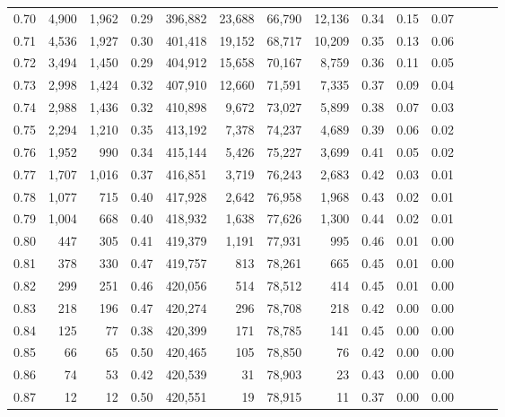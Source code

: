 \begin{tabular}{rrrrrrrrrrrrrr}
0.70 &   4,900 &  1,962 &  0.29 &  396,882 &   23,688 &  66,790 &  12,136 &  0.34 &  0.15 &      0.07 \\
0.71 &   4,536 &  1,927 &  0.30 &  401,418 &   19,152 &  68,717 &  10,209 &  0.35 &  0.13 &      0.06 \\
0.72 &   3,494 &  1,450 &  0.29 &  404,912 &   15,658 &  70,167 &   8,759 &  0.36 &  0.11 &      0.05 \\
0.73 &   2,998 &  1,424 &  0.32 &  407,910 &   12,660 &  71,591 &   7,335 &  0.37 &  0.09 &      0.04 \\
0.74 &   2,988 &  1,436 &  0.32 &  410,898 &    9,672 &  73,027 &   5,899 &  0.38 &  0.07 &      0.03 \\
0.75 &   2,294 &  1,210 &  0.35 &  413,192 &    7,378 &  74,237 &   4,689 &  0.39 &  0.06 &      0.02 \\
0.76 &   1,952 &    990 &  0.34 &  415,144 &    5,426 &  75,227 &   3,699 &  0.41 &  0.05 &      0.02 \\
0.77 &   1,707 &  1,016 &  0.37 &  416,851 &    3,719 &  76,243 &   2,683 &  0.42 &  0.03 &      0.01 \\
0.78 &   1,077 &    715 &  0.40 &  417,928 &    2,642 &  76,958 &   1,968 &  0.43 &  0.02 &      0.01 \\
0.79 &   1,004 &    668 &  0.40 &  418,932 &    1,638 &  77,626 &   1,300 &  0.44 &  0.02 &      0.01 \\
0.80 &     447 &    305 &  0.41 &  419,379 &    1,191 &  77,931 &     995 &  0.46 &  0.01 &      0.00 \\
0.81 &     378 &    330 &  0.47 &  419,757 &      813 &  78,261 &     665 &  0.45 &  0.01 &      0.00 \\
0.82 &     299 &    251 &  0.46 &  420,056 &      514 &  78,512 &     414 &  0.45 &  0.01 &      0.00 \\
0.83 &     218 &    196 &  0.47 &  420,274 &      296 &  78,708 &     218 &  0.42 &  0.00 &      0.00 \\
0.84 &     125 &     77 &  0.38 &  420,399 &      171 &  78,785 &     141 &  0.45 &  0.00 &      0.00 \\
0.85 &      66 &     65 &  0.50 &  420,465 &      105 &  78,850 &      76 &  0.42 &  0.00 &      0.00 \\
0.86 &      74 &     53 &  0.42 &  420,539 &       31 &  78,903 &      23 &  0.43 &  0.00 &      0.00 \\
0.87 &      12 &     12 &  0.50 &  420,551 &       19 &  78,915 &      11 &  0.37 &  0.00 &      0.00 \\

\end{tabular}
